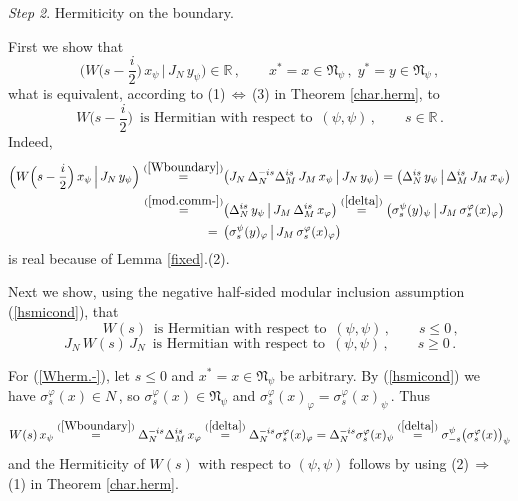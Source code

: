 \documentclass[reqno]{amsart}
\theoremstyle{definition}
\theoremstyle{remark}
\numberwithin{equation}{section}
\theoremstyle{plain}
\begin{document}
{\it Step 2}. {\sc Hermiticity on the boundary.}
\medskip

First we show that
\begin{equation*}
\Big( W\Big(s-\frac i2\Big)\, x_\psi\,\Big|\, J_N\, y_\psi \Big)
\in\mathbb R\, ,\qquad x^*=x\in\mathfrak N_\psi\, ,\; y^*=y\in
\mathfrak N_\psi\, ,
\end{equation*}
what is equivalent, according to (1)$\,\Leftrightarrow\,$(3) in
Theorem \ref{char.herm}, to
\begin{equation}\label{Wherm.imag}
W\Big(s-\frac i2\Big)\,\text{ is Hermitian with respect to }\,
(\psi ,\psi )\, ,\qquad s\in\mathbb R\, .
\end{equation}
Indeed,
\begin{align*}
\Big( W\Big(s-\frac i2\Big)\, x_\psi\,\Big|\, J_N\, y_\psi \Big)
\overset{(\ref{Wboundary})}{=} &\big( J_N\,\Delta_N^{-is}
\Delta_M^{is}\, J_M\, x_\psi\,\big|\, J_N\, y_\psi \big)
=\big( \Delta_N^{is}\, y_\psi\,\big|\,\Delta_M^{is}\, J_M\,
x_\psi \big) \\
\overset{(\ref{mod.comm-})}{=} &\big( \Delta_N^{is}\, y_\psi\,
\big|\, J_M\, \Delta_M^{is}\, x_\varphi \big)
\overset{(\ref{delta})}{=} \big( \sigma^\psi_s(y)_\psi\,\big|\,
J_M\, \sigma^\varphi_s(x)_\varphi \big) \\
\overset{\phantom{xxx}}{=}\, & \big( \sigma^\psi_s(y)_\varphi\,
\big|\, J_M\, \sigma^\varphi_s(x)_\varphi \big)
\end{align*}
is real because of Lemma \ref{fixed}.(2).

Next we show, using the negative half-sided modular inclusion
assumption (\ref{hsmicond}), that
\begin{equation}\label{Wherm.-} \phantom{xxxxx}
\, W(s)\,\text{ is Hermitian with respect to }\, (\psi ,\psi )\, ,
\qquad s\leq 0\, ,
\end{equation}
\begin{equation}\label{Wherm.+}
J_N\, W(s)\, J_N\,\text{ is Hermitian with respect to }\,
(\psi ,\psi )\, ,\qquad s\geq 0\, .
\end{equation}

For (\ref{Wherm.-}), let $s\leq 0$ and $x^*=x\in\mathfrak N_\psi$ be
arbitrary. By (\ref{hsmicond}) we have $\sigma^\varphi_s(x)\in N\,$,
so $\sigma^\varphi_s(x)\in \mathfrak N_\psi$ and
$\sigma^\varphi_s(x)_\varphi =\sigma^\varphi_s(x)_\psi\,$. Thus
\begin{equation*}
W(s)\, x_\psi \overset{(\ref{Wboundary})}{=} \Delta_N^{-is}
\Delta_M^{is}\, x_\varphi \overset{(\ref{delta})}{=}
\Delta_N^{-is} \sigma^\varphi_s(x)_\varphi =
\Delta_N^{-is} \sigma^\varphi_s(x)_\psi \overset{(\ref{delta})}{=}
\sigma^\psi_{-s}\big(\sigma^\varphi_s(x)\big)_\psi
\end{equation*}
and the Hermiticity of $W(s)$ with respect to $(\psi ,\psi )$
follows by using (2)$\,\Rightarrow\,$(1) in
Theorem \ref{char.herm}.
\end{document}

